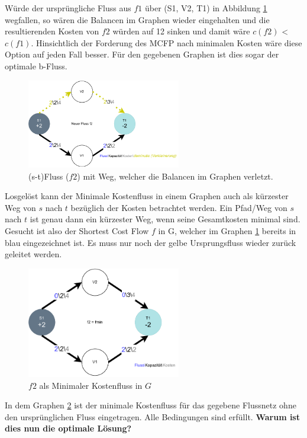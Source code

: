 Würde der ursprüngliche Fluss aus $f1$ über (S1, V2, T1) in Abbildung \ref{fig:invalid_b_flow} wegfallen, so wären die Balancen im Graphen wieder eingehalten und die resultierenden Kosten von $f2$ würden auf 12 sinken und damit wäre $c(f2)$ < $c(f1)$. Hinsichtlich der Forderung des MCFP nach minimalen Kosten wäre diese Option auf jeden Fall besser. Für den gegebenen Graphen ist dies sogar der optimale b-Fluss.
\begin{figure}[htb]
\centering
\includegraphics[width=0.6\textwidth]{img/steffen/invalid_b_flow.drawio.pdf}
\caption{(s-t)Fluss ($f2$) mit Weg, welcher die Balancen im Graphen verletzt.}
\label{fig:invalid_b_flow}
\end{figure}
Losgelöst kann der Minimale Kostenfluss in einem Graphen auch als kürzester Weg von $s$ nach $t$ bezüglich der Kosten betrachtet werden. Ein Pfad/Weg von $s$ nach $t$ ist genau dann ein kürzester Weg, wenn seine Gesamtkosten minimal sind. Gesucht ist also der Shortest Cost Flow $f$ in G, welcher im Graphen \ref{fig:invalid_b_flow} bereits in blau eingezeichnet ist. Es muss nur noch der gelbe Ursprungsfluss wieder zurück geleitet werden.
\begin{figure}[htb]
\centering
\includegraphics[width=0.6\textwidth]{img/steffen/min_cost_flow_graph.drawio.pdf}
\caption{$f2$ als Minimaler Kostenfluss in $G$}
\label{fig:min_cost_flow_graph}
\end{figure}
In dem Graphen \ref{fig:min_cost_flow_graph} ist der minimale Kostenfluss für das gegebene Flussnetz ohne den ursprünglichen Fluss eingetragen. Alle Bedingungen sind erfüllt. \textbf{Warum ist dies nun die optimale Lösung?}

